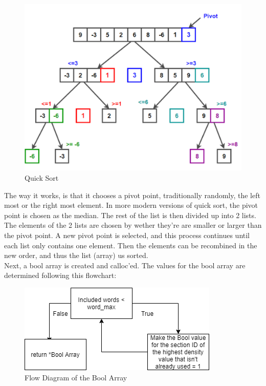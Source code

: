 \begin{figure}[H]
  \centering
  \includegraphics[scale = 0.7]{figures/qsort.png}
  \caption{Quick Sort \cite{quicksort}}
\end{figure}
The way it works, is that it chooses a pivot point, traditionally randomly, the left most or the right most element.
In more modern versions of quick sort, the pivot point is chosen as the median. The rest of the list is then divided up into 2 lists.
The elements of the 2 lists are chosen by wether they're are smaller or larger than the pivot point.
A new pivot point is selected, and this process continues until each list only contains one element. 
Then the elements can be recombined in the new order, and thus the list (array) us sorted.
\\
Next, a bool array is created and calloc'ed. The values for the bool array are determined following this flowchart:
\begin{figure}[H]
  \centering
  \includegraphics[scale = 0.6]{figures/include_flow.png}
  \caption{Flow Diagram of the Bool Array}
\end{figure} 
